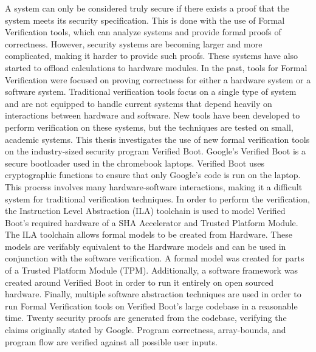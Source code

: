 A system can only be considered truly secure if there exists a proof that the system meets its security specification. 
This is done with the use of Formal Verification tools, which can analyze systems and provide formal proofs of correctness.
However, security systems are becoming larger and more complicated, making it harder to provide such proofs. 
These systems have also started to offload calculations to hardware modules.
In the past, tools for Formal Verification were focused on proving correctness for either a hardware system or a software system.
Traditional verification tools focus on a single type of system and are not equipped to handle current systems that depend heavily on interactions between hardware and software.
New tools have been developed to perform verification on these systems, but the techniques are tested on small, academic systems.
This thesis investigates the use of new formal verification tools on the industry-sized security program Verified Boot.
Google's Verified Boot is a secure bootloader used in the chromebook laptops.
Verified Boot uses cryptographic functions to ensure that only Google's code is run on the laptop.
This process involves many hardware-software interactions, making it a difficult system for traditional verification techniques.
In order to perform the verification, the Instruction Level Abstraction (ILA) toolchain is used to model Verified Boot's required hardware of a SHA Accelerator and Trusted Platform Module.
The ILA toolchain allows formal models to be created from Hardware.
These models are verifably equivalent to the Hardware models and can be used in conjunction with the software verification. 
A formal model was created for parts of a Trusted Platform Module (TPM). 
Additionally, a software framework was created around Verified Boot in order to run it entirely on open sourced hardware.
Finally, multiple software abstraction techniques are used in order to run Formal Verification tools on Verified Boot's large codebase in a reasonable time.
Twenty security proofs are generated from the codebase, verifying the claims originally stated by Google.
Program correctness, array-bounds, and program flow are verified against all possible user inputs.
